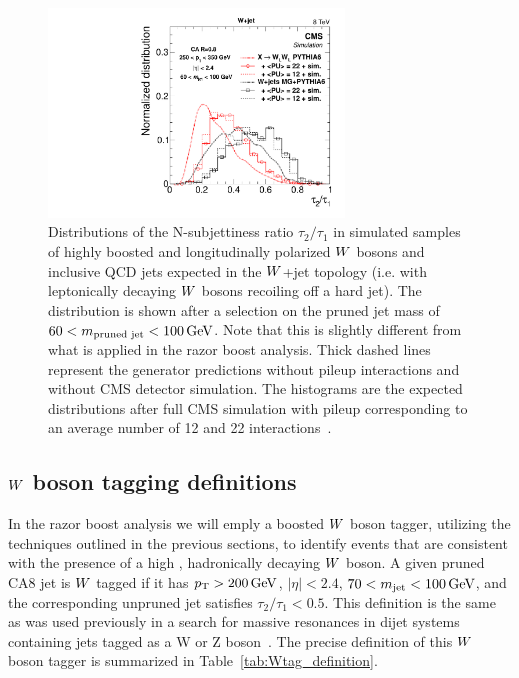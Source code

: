 \begin{figure}[htpb]
  \centering
  \includegraphics[width=0.7\textwidth]{figures/razor_wtag/tau2tau1_afterMass}
  \caption{Distributions of the N-subjettiness ratio $\tau_2 / \tau_1$ in simulated samples of
highly boosted and longitudinally polarized $W$ bosons and inclusive QCD jets expected in the
$W$+jet topology (i.e. with leptonically decaying $W$ bosons recoiling off a hard jet). 
The distribution is shown after a selection on the pruned jet mass of $60 < m_{\textrm{pruned jet}}
< 100 \,\text{Ge\hspace{-.08em}V}$. Note that this is slightly different from what is applied in the razor boost analysis.
Thick dashed lines represent the generator predictions without pileup interactions and without CMS
detector simulation. The histograms are the expected distributions after full CMS simulation with
pileup corresponding to an average number of 12 and 22 interactions~\cite{Khachatryan:2014vla}. 
  \label{fig:boost_wtag_tau2tau1}}
\end{figure}



\subsection{\texorpdfstring{$W$}{W} boson tagging definitions}

In the razor boost analysis we will emply a boosted $W$ boson tagger, utilizing the techniques
outlined in the previous sections, to identify events that are consistent with the presence of a
high \pt, hadronically decaying $W$ boson. 
A given pruned CA8 jet is $W$ tagged if it has $p_{\mathrm{T}} > 200\,\text{Ge\hspace{-.08em}V}$, $|\eta|<2.4$, $70 < m_\textrm{jet}
< 100\,\text{Ge\hspace{-.08em}V}$, and the corresponding unpruned jet satisfies $\tau_2 / \tau_1 < 0.5$.
This definition is the same as was used previously in a search for massive resonances in dijet
systems containing jets tagged as a W or Z boson~\cite{EXO-12-024,EXO-13-009}. 
The precise definition of this $W$ boson tagger is summarized in Table~\ref{tab:Wtag_definition}.

